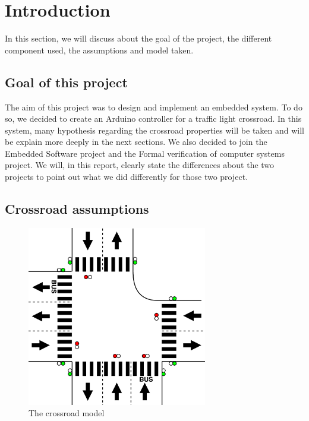 \section{Introduction}
In this section, we will discuss about the goal of the project, the different component used, the assumptions and model taken.

\subsection{Goal of this project}
The aim of this project was to design and implement an embedded system. To do so, we decided to create an Arduino controller for a traffic light crossroad. In this system, many hypothesis regarding the crossroad properties will be taken and will be explain more deeply in the next sections.
We also decided to join the Embedded Software project and the Formal verification of computer systems project. We will, in this report, clearly state the differences about the two projects to point out what we did differently for those two project.

\subsection{Crossroad assumptions}
\begin{figure}[!ht] \label{fig:crossroad}
  \centering
    \includegraphics[width=0.7\textwidth]{picture/crossroad.png}
    \caption{The crossroad model}
\end{figure}

